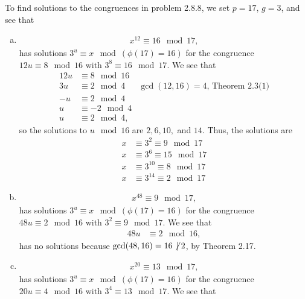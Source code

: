 \documentclass[12 pt]{amsart}
\begin{document}
  To find solutions to the congruences in problem 2.8.8, we set
  $p = 17$, $g = 3$, and see that 

  \begin{enumerate}[a.]
    \item
      \begin{align*}
        x^{12} \equiv 16 \mod 17,      
      \end{align*}
      has solutions $3^u \equiv x \mod (\phi(17) = 16)$ for the congruence 
      $12 u \equiv 8 \mod 16$ with $3^8 \equiv 16 \mod 17$. 
      We see that 
      \begin{align*}
        12 u &\equiv 8 \mod 16 \\
        3 u  & \equiv 2 \mod 4 & \text{$\gcd(12,16) = 4$, Theorem 2.3(1)} \\
        -u  & \equiv 2 \mod 4 \\
        u  & \equiv -2 \mod 4 \\
        u  & \equiv 2 \mod 4,
      \end{align*}
      so the solutions to $u \mod 16$ are $2, 6, 10,$ and $14$. 
      Thus, the solutions are 
      \begin{align*}
        x &\equiv 3^{2} \equiv 9 \mod 17 \\
        x &\equiv 3^{6} \equiv 15 \mod 17 \\
        x &\equiv 3^{10} \equiv 8 \mod 17 \\
        x &\equiv 3^{14} \equiv 2 \mod 17 
      \end{align*}
    \item
      \begin{align*}
        x^{48} \equiv 9 \mod 17,      
      \end{align*}
      has solutions $3^u \equiv x \mod (\phi(17) = 16)$ for  the congruence
      $48 u \equiv 2 \mod 16$ with $3^2 \equiv 9 \mod 17$. 
      We see that 
      \begin{align*}
        48 u &\equiv 2 \mod 16,
      \end{align*}
      has no solutions because $\gcd(48, 16) = 16 \not \, \mid 2$, 
      by Theorem 2.17. 
    \item
      \begin{align*}
        x^{20} \equiv 13 \mod 17,      
      \end{align*}
      has solutions $3^u \equiv x \mod (\phi(17) = 16)$ for the congruence
      $20 u \equiv 4 \mod 16$ with $3^4 \equiv 13 \mod 17$. 
      We see that 
      \begin{align*}

\end{align*}
\end{enumerate}
\end{document}
